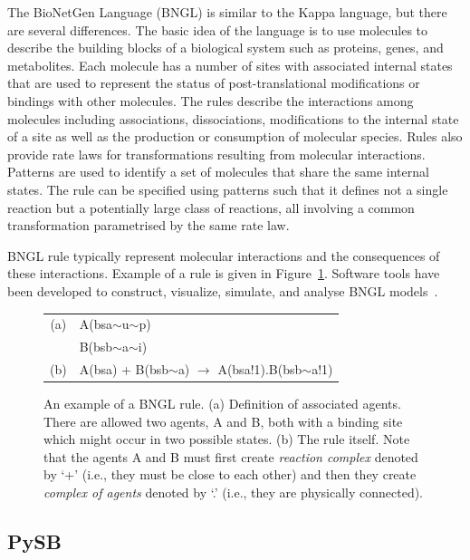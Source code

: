 \documentclass[11pt,a4paper]{report}
\begin{document}
The BioNetGen Language (BNGL) \cite{harris2016bionetgen} is similar to the Kappa language, but there are several differences. The basic idea of the language is to use molecules to describe the building blocks of a biological system such as proteins, genes, and metabolites. Each molecule has a number of sites with associated internal states that are used to represent the status of post-translational modifications or bindings with other molecules. The rules describe the interactions among molecules including associa­tions, dissociations, modifications to the internal state of a site as well as the production or consumption of molecular species. Rules also provide rate laws for transformations resulting from molecular interactions. Patterns are used to identify a set of molecules that share the same internal states. The rule can be specified using patterns such that it defines not a single reaction but a potentially large class of reactions, all involving a common transformation parametrised by the same rate law.

BNGL rule typically represent molecular interactions and the consequences of these interactions. Example of a rule is given in Figure~\ref{bngl-rule}. Software tools have been developed to construct, visualize, simulate, and analyse BNGL models~\cite{wenskovitch2014mosbie,harris2016bionetgen,xu2011rulebender,sneddon2011efficient}.

\begin{figure}[!h]
\begin{center}
\begin{tabular}{c l}
(a) & A(bsa$\sim$u$\sim$p) \\
  & B(bsb$\sim$a$\sim$i) \\
(b) & A(bsa) + B(bsb$\sim$a) $\rightarrow$ A(bsa!1).B(bsb$\sim$a!1) \\
\end{tabular}
\end{center}
\caption{An example of a BNGL rule. (a) Definition of associated agents. There are allowed two agents, A and B, both with a binding site which might occur in two possible states. (b) The rule itself. Note that the agents A and B must first create \emph{reaction complex} denoted by `+' (i.e., they must be close to each other) and then they create \emph{complex of agents} denoted by `.' (i.e., they are physically connected).}\label{bngl-rule}
\end{figure}

\subsection{PySB}
\end{document}

